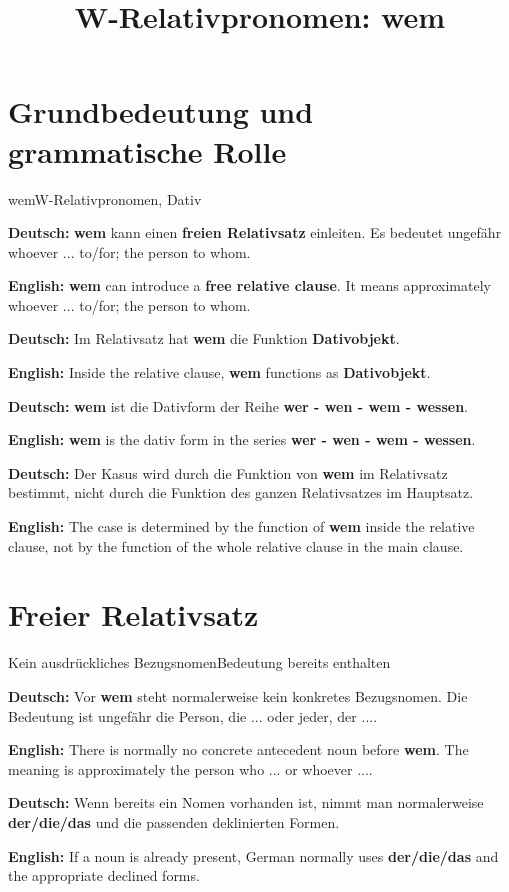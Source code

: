 \documentclass[a4paper,11pt]{article}
\title{W-Relativpronomen: \glqq wem\grqq{}}
\date{}
\newcommand{\GermanText}[1]{\textbf{Deutsch: }#1\par}
\newcommand{\EnglishText}[1]{{\small\color{SoftGray}\textbf{English: }#1\par}}
\begin{document}
\maketitle

\tableofcontents

\newpage

\section{Grundbedeutung und grammatische Rolle}

\begin{grammarentry}{wem}{W-Relativpronomen, Dativ}

\GermanText{\textbf{wem} kann einen \textbf{freien Relativsatz} einleiten. Es bedeutet ungefähr \glqq whoever ... to/for; the person to whom\grqq{}.}

\EnglishText{\textbf{wem} can introduce a \textbf{free relative clause}. It means approximately \glqq whoever ... to/for; the person to whom\grqq{}.}

\GermanText{Im Relativsatz hat \textbf{wem} die Funktion \textbf{Dativobjekt}.}

\EnglishText{Inside the relative clause, \textbf{wem} functions as \textbf{Dativobjekt}.}

\GermanText{\textbf{wem} ist die Dativform der Reihe \textbf{wer - wen - wem - wessen}.}

\EnglishText{\textbf{wem} is the dativ form in the series \textbf{wer - wen - wem - wessen}.}

\GermanText{Der Kasus wird durch die Funktion von \textbf{wem} im Relativsatz bestimmt, nicht durch die Funktion des ganzen Relativsatzes im Hauptsatz.}

\EnglishText{The case is determined by the function of \textbf{wem} inside the relative clause, not by the function of the whole relative clause in the main clause.}

\end{grammarentry}

\section{Freier Relativsatz}

\begin{grammarentry}{Kein ausdrückliches Bezugsnomen}{Bedeutung bereits enthalten}

\GermanText{Vor \textbf{wem} steht normalerweise kein konkretes Bezugsnomen. Die Bedeutung ist ungefähr \glqq die Person, die ...\grqq{} oder \glqq jeder, der ...\grqq{}.}

\EnglishText{There is normally no concrete antecedent noun before \textbf{wem}. The meaning is approximately \glqq the person who ...\grqq{} or \glqq whoever ...\grqq{}.}

\GermanText{Wenn bereits ein Nomen vorhanden ist, nimmt man normalerweise \textbf{der/die/das} und die passenden deklinierten Formen.}

\EnglishText{If a noun is already present, German normally uses \textbf{der/die/das} and the appropriate declined forms.}

\end{grammarentry}
\end{document}
